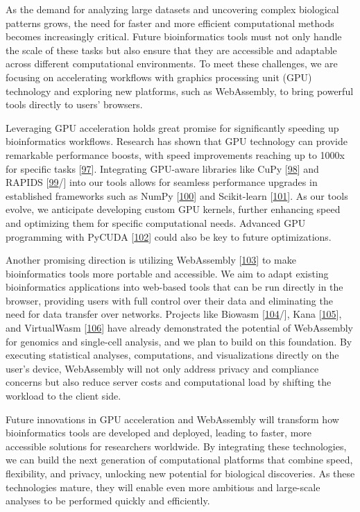 As the demand for analyzing large datasets and uncovering complex biological patterns grows, the need for faster and more efficient computational methods becomes increasingly critical.
Future bioinformatics tools must not only handle the scale of these tasks but also ensure that they are accessible and adaptable across different computational environments.
To meet these challenges, we are focusing on accelerating workflows with graphics processing unit (GPU) technology and exploring new platforms, such as WebAssembly, to bring powerful tools directly to users' browsers.

Leveraging GPU acceleration holds great promise for significantly speeding up bioinformatics workflows.
Research has shown that GPU technology can provide remarkable performance boosts, with speed improvements reaching up to 1000x for specific tasks {[}\protect\hyperlink{ref-1EIbaYHGq}{97}{]}.
Integrating GPU-aware libraries like CuPy {[}\protect\hyperlink{ref-JMQXR7X9}{98}{]} and RAPIDS {[}\protect\hyperlink{ref-wPsNXL1Q}{99}/{]} into our tools allows for seamless performance upgrades in established frameworks such as NumPy {[}\protect\hyperlink{ref-1LexfAxj}{100}{]} and Scikit-learn {[}\protect\hyperlink{ref-AujvwLp6}{101}{]}.
As our tools evolve, we anticipate developing custom GPU kernels, further enhancing speed and optimizing them for specific computational needs.
Advanced GPU programming with PyCUDA {[}\protect\hyperlink{ref-b5xmRoLZ}{102}{]} could also be key to future optimizations.

Another promising direction is utilizing WebAssembly {[}\protect\hyperlink{ref-ITQaZvrQ}{103}{]} to make bioinformatics tools more portable and accessible.
We aim to adapt existing bioinformatics applications into web-based tools that can be run directly in the browser, providing users with full control over their data and eliminating the need for data transfer over networks.
Projects like Biowasm {[}\protect\hyperlink{ref-Z0f406Zs}{104}/{]}, Kana {[}\protect\hyperlink{ref-1DswCJYT0}{105}{]}, and VirtualWasm {[}\protect\hyperlink{ref-WhJVE7a4}{106}{]} have already demonstrated the potential of WebAssembly for genomics and single-cell analysis, and we plan to build on this foundation.
By executing statistical analyses, computations, and visualizations directly on the user's device, WebAssembly will not only address privacy and compliance concerns but also reduce server costs and computational load by shifting the workload to the client side.

Future innovations in GPU acceleration and WebAssembly will transform how bioinformatics tools are developed and deployed, leading to faster, more accessible solutions for researchers worldwide.
By integrating these technologies, we can build the next generation of computational platforms that combine speed, flexibility, and privacy, unlocking new potential for biological discoveries.
As these technologies mature, they will enable even more ambitious and large-scale analyses to be performed quickly and efficiently.


